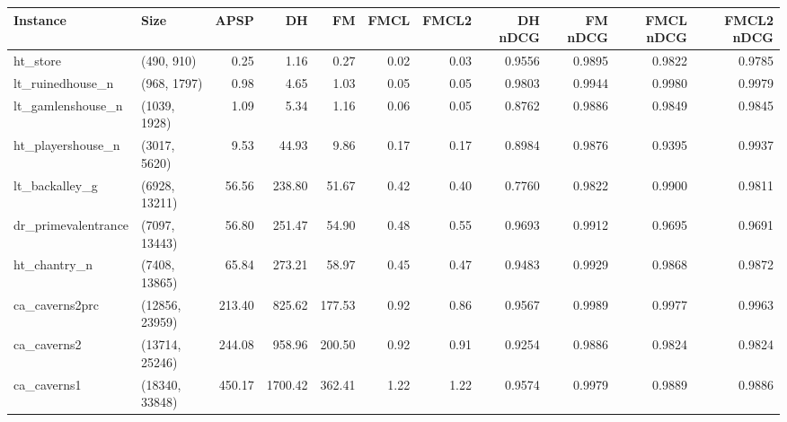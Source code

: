 \begin{tabular}{llrrrrrrrrr}
\toprule
           Instance &           Size &   APSP &      DH &     FM &  FMCL &  FMCL2 &  DH nDCG &  FM nDCG &  FMCL nDCG &  FMCL2 nDCG \\
\midrule
           ht\_store &     (490, 910) &   0.25 &    1.16 &   0.27 &  0.02 &   0.03 &   0.9556 &   0.9895 &     0.9822 &      0.9785 \\
   lt\_ruinedhouse\_n &    (968, 1797) &   0.98 &    4.65 &   1.03 &  0.05 &   0.05 &   0.9803 &   0.9944 &     0.9980 &      0.9979 \\
  lt\_gamlenshouse\_n &   (1039, 1928) &   1.09 &    5.34 &   1.16 &  0.06 &   0.05 &   0.8762 &   0.9886 &     0.9849 &      0.9845 \\
  ht\_playershouse\_n &   (3017, 5620) &   9.53 &   44.93 &   9.86 &  0.17 &   0.17 &   0.8984 &   0.9876 &     0.9395 &      0.9937 \\
     lt\_backalley\_g &  (6928, 13211) &  56.56 &  238.80 &  51.67 &  0.42 &   0.40 &   0.7760 &   0.9822 &     0.9900 &      0.9811 \\
dr\_primevalentrance &  (7097, 13443) &  56.80 &  251.47 &  54.90 &  0.48 &   0.55 &   0.9693 &   0.9912 &     0.9695 &      0.9691 \\
       ht\_chantry\_n &  (7408, 13865) &  65.84 &  273.21 &  58.97 &  0.45 &   0.47 &   0.9483 &   0.9929 &     0.9868 &      0.9872 \\
     ca\_caverns2prc & (12856, 23959) & 213.40 &  825.62 & 177.53 &  0.92 &   0.86 &   0.9567 &   0.9989 &     0.9977 &      0.9963 \\
        ca\_caverns2 & (13714, 25246) & 244.08 &  958.96 & 200.50 &  0.92 &   0.91 &   0.9254 &   0.9886 &     0.9824 &      0.9824 \\
        ca\_caverns1 & (18340, 33848) & 450.17 & 1700.42 & 362.41 &  1.22 &   1.22 &   0.9574 &   0.9979 &     0.9889 &      0.9886 \\
\bottomrule
\end{tabular}

